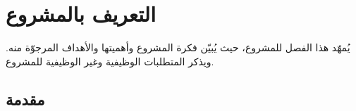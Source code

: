 

\chapter{التعريف بالمشروع}
يُمهّد هذا الفصل للمشروع، حيث يُبيّن فكرة المشروع وأهميتها والأهداف المرجوّة منه. ويذكر المتطلبات الوظيفية وغير الوظيفية للمشروع.

\section{مقدمة}
